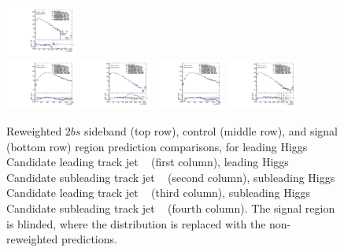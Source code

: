 \begin{figure}[htbp!]
\begin{center}
\includegraphics[width=0.21\textwidth,angle=-90]{figures/boosted/AppendixReweight/Compare/Data_TwoTag_split_Control_directcompare_sublHCand_trk1_Pt_1.pdf}\\
\includegraphics[width=0.21\textwidth,angle=-90]{figures/boosted/AppendixReweight/Compare/Data_TwoTag_split_Signal_directcompare_leadHCand_trk0_Pt_1.pdf}
\includegraphics[width=0.21\textwidth,angle=-90]{figures/boosted/AppendixReweight/Compare/Data_TwoTag_split_Signal_directcompare_leadHCand_trk1_Pt_1.pdf}
\includegraphics[width=0.21\textwidth,angle=-90]{figures/boosted/AppendixReweight/Compare/Data_TwoTag_split_Signal_directcompare_sublHCand_trk0_Pt_1.pdf}
\includegraphics[width=0.21\textwidth,angle=-90]{figures/boosted/AppendixReweight/Compare/Data_TwoTag_split_Signal_directcompare_sublHCand_trk1_Pt_1.pdf}\\
\caption{Reweighted $2bs$ sideband (top row), control (middle row), and signal (bottom row) region prediction comparisons, for leading Higgs Candidate leading track jet \pt~ (first column),  leading Higgs Candidate subleading track jet \pt~ (second column), subleading Higgs Candidate leading track jet \pt~ (third column), subleading Higgs Candidate subleading track jet \pt~ (fourth column). The signal region is blinded, where the distribution is replaced with the non-reweighted predictions.}
\label{fig:app-rw-comp-2bs-trkjet}
\end{center}
\end{figure}

